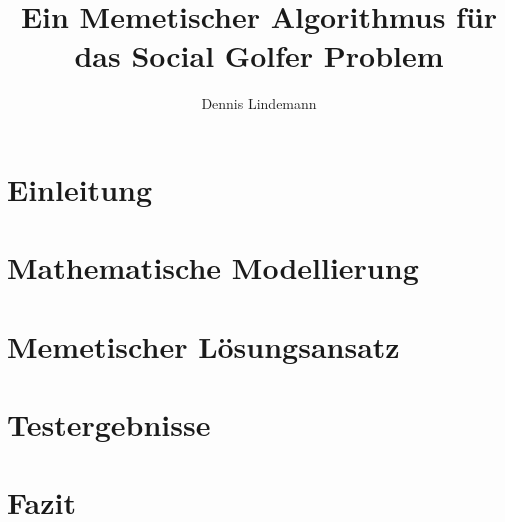 \documentclass[draft]{tcs-seminar}
\begin{document}
\title{Ein Memetischer Algorithmus für das Social Golfer Problem}
\author{Dennis Lindemann}

\begin{abstract}

\end{abstract}

\maketitle


\section{Einleitung}
  


\section{Mathematische Modellierung}
    


\section{Memetischer Lösungsansatz}
  

\section{Testergebnisse}
  


\section{Fazit}
  

\begin{thebibliography}{9}  
    
\end{thebibliography}
\end{document}
